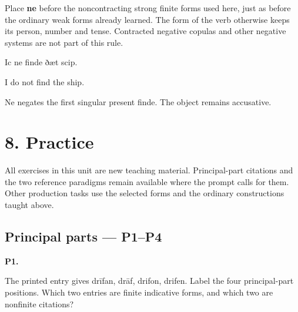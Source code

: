 Place \textbf{ne} before the noncontracting strong finite forms used here, just as before the ordinary weak forms already learned. The form of the verb otherwise keeps its person, number and tense. Contracted negative copulas and other negative systems are not part of this rule.

Ic ne finde ðæt scip.

I do not find the ship.

Ne negates the first singular present finde. The object remains accusative.

\section*{8. Practice}

All exercises in this unit are new teaching material. Principal-part citations and the two reference paradigms remain available where the prompt calls for them. Other production tasks use the selected forms and the ordinary constructions taught above.

\subsection*{Principal parts — P1–P4}

\par\begin{minipage}{\linewidth}\raggedright
\textbf{P1.}

The printed entry gives drīfan, drāf, drifon, drifen. Label the four principal-part positions. Which two entries are finite indicative forms, and which two are nonfinite citations?

\end{minipage}\par\addvspace{4pt}

